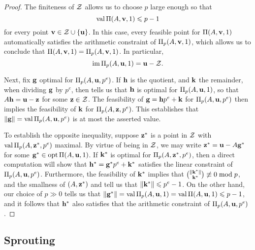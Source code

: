 \documentclass[11pt]{amsart}
\begin{document}
{\begin{proof}
The finiteness of $\mathcal{Z}$ allows us to choose $p$ large enough so that \[ \operatorname{val} \Pi(A, \mathbf{v}, 1) \leqslant p -1 \] for every point $\mathbf{v} \in \mathcal{Z} \cup \{ \mathbf{u} \}$.  In this case, every feasible point for $\Pi(A, \mathbf{v}, 1)$  automatically satisfies the arithmetic constraint of $\Pi_p(A, \mathbf{v}, 1)$, which allows us to conclude that $\Pi(A, \mathbf{v}, 1) = \Pi_p(A, \mathbf{v}, 1)$.  In particular,
\[ \operatorname{im} \Pi_p(A, \mathbf{u}, 1) =\mathbf{u} - \mathcal{Z}. \]

Next, fix $\mathbf{g}$ optimal for $\Pi_p(A, \mathbf{u}, p^e)$.  If $\mathbf{h}$ is the quotient, and $\mathbf{k}$ the remainder, when dividing $\mathbf{g}$ by $p^e$, then  tells us that $\mathbf{h}$ is optimal for $\Pi_p(A, \mathbf{u}, 1)$, so that $A \mathbf{h} = \mathbf{u}-\mathbf{z}$ for some $\mathbf{z} \in \mathcal{Z}$.  The feasibility of $\mathbf{g}=\mathbf{h}p^e + \mathbf{k}$ for $\Pi_p(A, \mathbf{u}, p^e)$ then implies the feasibility of $\mathbf{k}$ for $\Pi_p(A, \mathbf{z}, p^e)$.  This establishes that $\| \mathbf{g} \| = \operatorname{val} \Pi_p(A, \mathbf{u}, p^e)$ is at most the asserted value.

To establish the opposite inequality, suppose $\mathbf{z}^{\ast}$ is a point in $\mathcal{Z}$ with $\operatorname{val} \Pi_p(A, \mathbf{z}^{\ast}, p^e)$ maximal.  By virtue of being in $\mathcal{Z}$, we may write $\mathbf{z}^{\ast} = \mathbf{u} - A \mathbf{g}^{\ast}$ for some $\mathbf{g}^{\ast} \in \operatorname{opt} \Pi(A, \mathbf{u}, 1)$.  If $\mathbf{k}^{\ast}$ is optimal for $\Pi_p(A, \mathbf{z}^{\ast}, p^e)$, then a direct computation will show that
$\mathbf{h}^{\ast} = \mathbf{g}^{\ast} p^e + \mathbf{k}^{\ast}$ satisfies the linear constraint of  $\Pi_p(A, \mathbf{u}, p^e)$.  Furthermore, the feasibility of $\mathbf{k}^{\ast}$ implies that $\binom{\| \mathbf{k}^{\ast} \|}{\mathbf{k}^{\ast}} \not \equiv 0 \bmod p$, and the smallness of $(A, \mathbf{z}^{\ast})$ and  tell us that $\| \mathbf{k}^{\ast} \| \leqslant p^e-1$.  On the other hand, our choice of $p \gg 0$ tells us that $\| \mathbf{g}^{\ast} \| = \operatorname{val} \Pi_p(A, \mathbf{u}, 1) = \operatorname{val} \Pi(A, \mathbf{u}, 1) \leqslant p-1$, and it follows that $\mathbf{h}^{\ast}$ also satisfies that the arithmetic constraint of $\Pi_p(A, \mathbf{u}, p^e)$.
\end{proof}
}


\subsection{Sprouting}

\end{document}
